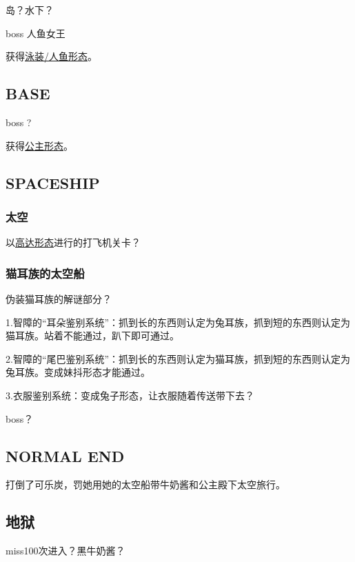 \documentclass{article}
\begin{document}
岛？水下？

boss 人鱼女王

获得\hyperref[costume_mermaid]{泳装/人鱼形态}。

\subsection{BASE}

boss ?

获得\hyperref[costume_hime]{公主形态}。

\subsection{SPACESHIP}

\subsubsection{太空}

以\hyperref[costume_gundam]{高达形态}进行的打飞机关卡？

\subsubsection{猫耳族的太空船}

伪装猫耳族的解谜部分？

1.智障的“耳朵鉴别系统”：抓到长的东西则认定为兔耳族，抓到短的东西则认定为猫耳族。站着不能通过，趴下即可通过。

2.智障的“尾巴鉴别系统”：抓到长的东西则认定为猫耳族，抓到短的东西则认定为兔耳族。变成妹抖形态才能通过。

3.衣服鉴别系统：变成兔子形态，让衣服随着传送带下去？

boss？

\subsection{NORMAL END}

打倒了可乐炭，罚她用她的太空船带牛奶酱和公主殿下太空旅行。

\subsection{地狱}

miss100次进入？黑牛奶酱？
\end{document}
